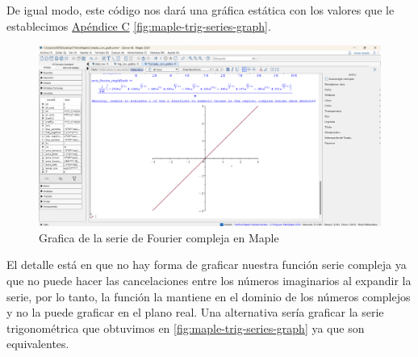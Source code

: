 De igual modo, este código nos dará una gráfica estática con los valores que le establecimos \hyperref[app3:trig-code-maple]{Apéndice C} \ref{fig:maple-trig-series-graph}. 
\begin{figure}[H]
	\centering
	\includegraphics[width=1\textwidth]{img/chapter02/maple-complex-graph.png}
	\caption{Grafica de la serie de Fourier compleja en Maple}
	\label{fig:maple-complex-series-graph}  %
\end{figure}
El detalle está en que no hay forma de graficar nuestra función serie compleja ya que no puede hacer las cancelaciones entre los números imaginarios al expandir la serie, por lo tanto, la función la mantiene en el dominio de los números complejos y no la puede graficar en el plano real. Una alternativa sería graficar la serie trigonométrica que obtuvimos en \ref{fig:maple-trig-series-graph} ya que son equivalentes.

